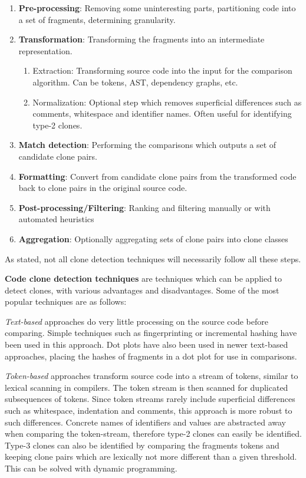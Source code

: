 \documentclass[12pt]{article}
\begin{document}
\begin{enumerate}
    \item \textbf{Pre-processing}: Removing some uninteresting parts, partitioning code into a set
        of fragments, determining granularity.
    \item \textbf{Transformation}: Transforming the fragments into an intermediate representation.
    \begin{enumerate}
        \item Extraction: Transforming source code into the input for the comparison
            algorithm. Can be tokens, AST, dependency graphs, etc.
        \item Normalization: Optional step which removes superficial differences such as
            comments, whitespace and identifier names. Often useful for identifying type-2
            clones.
    \end{enumerate}
    \item \textbf{Match detection}: Performing the comparisons which outputs a set of
        candidate clone pairs.
    \item \textbf{Formatting}: Convert from candidate clone pairs from the transformed
        code back to clone pairs in the original source code.
    \item \textbf{Post-processing/Filtering}: Ranking and filtering manually or with
        automated heuristics
    \item \textbf{Aggregation}: Optionally aggregating sets of clone pairs into clone classes
\end{enumerate}

As stated, not all clone detection techniques will necessarily follow all these steps.

\textbf{Code clone detection techniques} are techniques which can be applied to detect
clones, with various advantages and disadvantages. Some of the most popular techniques are
as follows:

\textit{Text-based} approaches do very little processing on the source code before
comparing. Simple techniques such as fingerprinting or incremental hashing have been used
in this approach. Dot plots have also been used in newer text-based approaches, placing
the hashes of fragments in a dot plot for use in comparisons.

\textit{Token-based} approaches transform source code into a stream of tokens, similar to
lexical scanning in compilers. The token stream is then scanned for duplicated
subsequences of tokens. Since token streams rarely include superficial differences
such as whitespace, indentation and comments, this approach is more robust to such
differences. Concrete names of identifiers and values are abstracted away when comparing
the token-stream, therefore type-2 clones can easily be identified. Type-3 clones can also
be identified by comparing the fragments tokens and keeping clone pairs which are
lexically not more different than a given threshold. This can be solved with dynamic
programming\cite{BakerSparseDynamicProgramming}.
\end{document}
